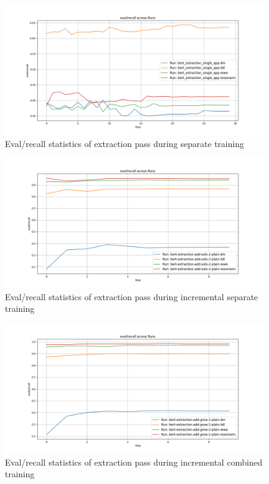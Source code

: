 \documentclass[licencjacka,en]{pracamgr}
\begin{document}
\begin{appendices}
\begin{figure}[h]
    \centering
    \includegraphics[width=0.8\linewidth]{bachelor_images/e_ers.png}
    \caption{Eval/recall statistics of extraction pass during separate training}
    \label{fig:e_ers}
\end{figure}

\begin{figure}[h]
    \centering
    \includegraphics[width=0.8\linewidth]{bachelor_images/e_eras.png}
    \caption{Eval/recall statistics of extraction pass during incremental separate training}
    \label{fig:e_eras}
\end{figure}

\begin{figure}[h]
    \centering
    \includegraphics[width=0.8\linewidth]{bachelor_images/e_erag.png}
    \caption{Eval/recall statistics of extraction pass during incremental combined training}
    \label{fig:e_erag}
\end{figure}


\end{appendices}
\end{document}
